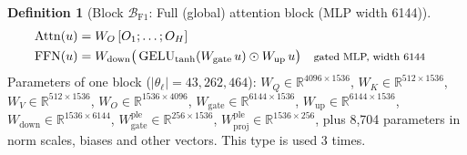 \documentclass[10pt,a4paper]{article}
\newcommand{\op}[1]{\operatorname{#1}}
\theoremstyle{definition}
\newtheorem{definition}{Definition}[section]
\begin{document}
\begin{definition}[Block $\mathcal{B}_{\mathrm{F1}}$: Full (global) attention block (MLP width 6144)]
\begin{align*}
  \op{Attn}(u) &= W_O\,[O_1;\dots;O_H] \\
  \op{FFN}(u) &= W_{\mathrm{down}}\big(\op{GELU}_{\tanh}(W_{\mathrm{gate}}\,u)\odot W_{\mathrm{up}}\,u\big) && \text{\footnotesize gated MLP, width 6144}
\end{align*}
Parameters of one block ($|\theta_\ell|=43{,}262{,}464$): $W_Q\in\mathbb{R}^{4096\times1536}$, $W_K\in\mathbb{R}^{512\times1536}$, $W_V\in\mathbb{R}^{512\times1536}$, $W_O\in\mathbb{R}^{1536\times4096}$, $W_{\mathrm{gate}}\in\mathbb{R}^{6144\times1536}$, $W_{\mathrm{up}}\in\mathbb{R}^{6144\times1536}$, $W_{\mathrm{down}}\in\mathbb{R}^{1536\times6144}$, $W^{\mathrm{ple}}_{\mathrm{gate}}\in\mathbb{R}^{256\times1536}$, $W^{\mathrm{ple}}_{\mathrm{proj}}\in\mathbb{R}^{1536\times256}$, plus 8,704 parameters in norm scales, biases and other vectors. This type is used 3 times.
\end{definition}
\end{document}
